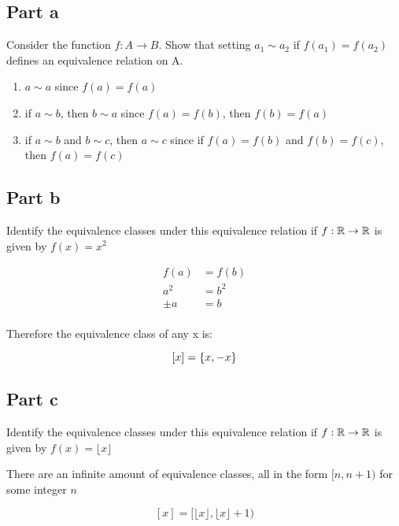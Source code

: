 \documentclass[12pt]{article} %
\begin{document}
\pagebreak

\begin{homeworkProblem}
    \subsection*{Part a}

    \begin{grayBoxed}
        Consider the function $f: A \rightarrow B$. Show that setting $a_1 \sim a_2$ if $f(a_1) = f(a_2)$ defines an equivalence relation on A.
    \end{grayBoxed}

    \begin{enumerate}
        \item $a \sim a$ since $f(a) = f(a)$
        \item if $a \sim b$, then $b \sim a$ since $f(a) = f(b)$, then $f(b) = f(a)$
        \item if $a \sim b$ and $b \sim c$, then $a \sim c$ since if $f(a) = f(b)$ and $f(b) = f(c)$, then $f(a) = f(c)$
    \end{enumerate}

    \subsection*{Part b}

    \begin{grayBoxed}
        Identify the equivalence classes under this equivalence relation if $f: \mathbb{R} \rightarrow \mathbb{R}$ is given by $f(x) = x^2$
    \end{grayBoxed}

    \begin{align*}
        f(a)  & = f(b) \\
        a^2   & = b^2  \\
        \pm a & = b    \\
    \end{align*}

    Therefore the equivalence class of any x is:

    $$[x] = \left\{x, -x\right\}$$

    \subsection*{Part c}

    \begin{grayBoxed}
        Identify the equivalence classes under this equivalence relation if $f: \mathbb{R} \rightarrow \mathbb{R}$ is given by $f(x) = \lfloor x \rfloor$
    \end{grayBoxed}

    There are an infinite amount of equivalence classes, all in the form $[n, n + 1)$ for some integer $n$

    $$[x] = [\lfloor x\rfloor, \lfloor x\rfloor + 1)$$

\end{homeworkProblem}
\end{document}
